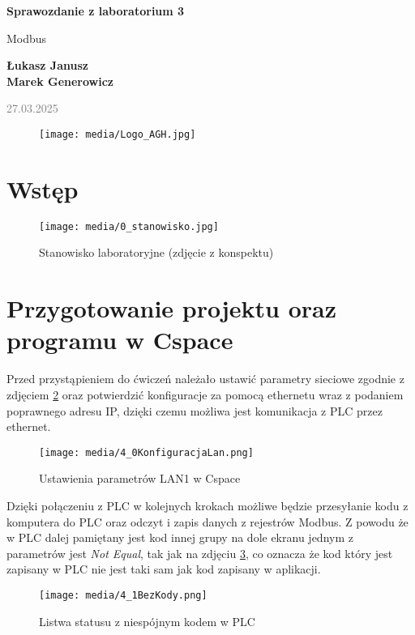 \documentclass{article}
\begin{document}
\begin{titlepage}
    \begin{center}
        \vspace*{1cm}
            
        \Huge
        \textbf{Sprawozdanie z laboratorium 3}
            
        \vspace{0.5cm}
        \LARGE
        Modbus 
            
        \vspace{1.5cm}
            
        \textbf{Łukasz Janusz\\Marek Generowicz}

        \normalsize      
        \textcolor{gray}{27.03.2025}
        \vfill
        \begin{figure}[hb]
            \centering
            \texttt{[image: media/Logo\_AGH.jpg]}
        \end{figure}   
    \end{center}
\end{titlepage}

\section{Wstęp}

\begin{figure}[H]
    \centering
    \texttt{[image: media/0\_stanowisko.jpg]}
    \caption{Stanowisko laboratoryjne (zdjęcie z konspektu)}
    \label{fig:stanowisko}
\end{figure}


\newpage
\section{Przygotowanie projektu oraz programu w Cspace}


Przed przystąpieniem do ćwiczeń należało ustawić parametry sieciowe zgodnie z zdjęciem \ref{fig:zdj1} oraz potwierdzić konfiguracje za pomocą ethernetu wraz z podaniem poprawnego adresu IP, dzięki czemu możliwa jest komunikacja z PLC przez ethernet.
\begin{figure}[H]
    \centering
    \texttt{[image: media/4\_0KonfiguracjaLan.png]}
    \caption{Ustawienia parametrów LAN1 w Cspace}
    \label{fig:zdj1}
\end{figure}

Dzięki połączeniu z PLC w kolejnych krokach możliwe będzie przesyłanie kodu z komputera do PLC oraz odczyt i zapis danych z rejestrów Modbus. Z powodu że w PLC dalej pamiętany jest kod innej grupy na dole ekranu jednym z parametrów jest \textit{Not Equal}, tak jak na zdjęciu \ref{fig:zdj2}, co oznacza że kod który jest zapisany w PLC nie jest taki sam jak kod zapisany w aplikacji.
\begin{figure}[H]
    \centering
    \texttt{[image: media/4\_1BezKody.png]}
    \caption{Listwa statusu z niespójnym kodem w PLC}
    \label{fig:zdj2}
\end{figure}
\end{document}
